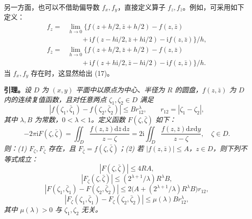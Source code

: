 \documentclass[UTF8,a4paper,11pt,fontset=fandol]{ctexart}
\newcommand{\dd}{\mathrm d}
\newcommand{\ii}{\mathrm i}
\newcommand{\dz}{\dd\bar z\,\dd z}
\newcommand{\zz}{\bar\zeta}
\begin{document}
另一方面，也可以不借助偏导数 $f_x,f_y$，直接定义算子 $f_z,f_{\bar z}$。例如，可采用如下定义：
\begin{equation}\begin{aligned}
f_z={}&\lim_{h\to0}\bigl\{f(z+h/2,\bar z+h/2)-f(z,\bar z)\\
&\qquad+\ii f(z-h\ii/2,\bar z+h\ii/2)-\ii f(z,\bar z)\bigr\}/h,\\
f_{\bar z}={}&\lim_{h\to0}\bigl\{f(z+h/2,\bar z+h/2)-f(z,\bar z)\\
&\qquad+\ii f(z+h\ii/2,\bar z-h\ii/2)-\ii f(z,\bar z)\bigr\}/h.
\end{aligned}\tag{18}\end{equation}
当 $f_x,f_y$ 存在时，这显然给出 (17)。

\textbf{引理。}\textit{设 $D$ 为 $(x,y)$ 平面中以原点为中心、半径为 $R$ 的圆盘，$f(z,\bar z)$ 为 $D$ 内的连续复值函数，且对任意两点 $\zeta_1,\zeta_2\in D$ 满足
\begin{equation}|f(\zeta_1,\bar\zeta_1)-f(\zeta_2,\bar\zeta_2)|\le Br_{12}^{\lambda},\qquad r_{12}=|\zeta_1-\zeta_2|,\tag{19}\end{equation}
其中 $\lambda,B$ 为常数，$0<\lambda<1$。定义函数 $F(\zeta,\bar\zeta)$ 如下：
\begin{equation}-2\pi\ii F(\zeta,\zz)=\iint_D\frac{f(z,\bar z)\dz}{z-\zeta}=2\ii\iint_D\frac{f(z,\bar z)\dd x\dd y}{z-\zeta},\quad\zeta\in D.\tag{20}\end{equation}
则：(1) $F_\zeta,F_{\bar\zeta}$ 存在，且 $F_{\bar\zeta}=f(\zeta,\bar\zeta)$；(2) 若 $|f(z,\bar z)|\le A$，$z\in D$，则下列不等式成立：
\begin{equation}|F(\zeta,\zz)|\le4RA,\tag{21}\end{equation}
\begin{equation}|F_\zeta(\zeta,\zz)|\le(2^{\lambda+1}/\lambda)R^\lambda B,\tag{22}\end{equation}
\begin{equation}|F(\zeta_1,\bar\zeta_1)-F(\zeta_2,\bar\zeta_2)|\le2\bigl(A+(2^{\lambda+1}/\lambda)R^\lambda B\bigr)r_{12},\tag{23}\end{equation}
\begin{equation}|F_\zeta(\zeta_1,\bar\zeta_1)-F_\zeta(\zeta_2,\bar\zeta_2)|\le\mu(\lambda)Br_{12}^\lambda,\tag{24}\end{equation}
其中 $\mu(\lambda)>0$ 与 $\zeta_1,\zeta_2$ 无关。}
\end{document}
